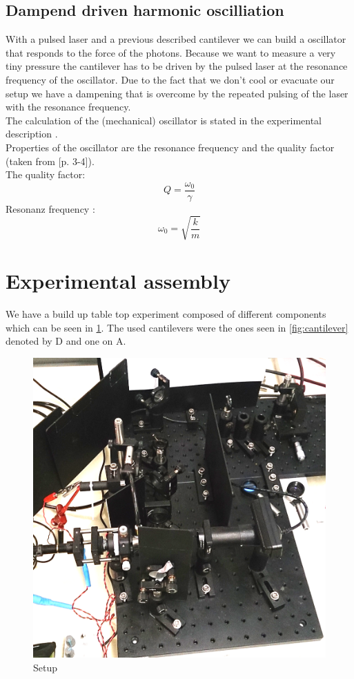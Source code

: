 \documentclass[12pt,a4paper]{article}
\begin{document}
\begin{multicols}{2}
\subsection{Dampend driven harmonic oscilliation}
With a pulsed laser and a previous described cantilever we can build a oscillator that responds to the force of the photons. Because we want to measure a very tiny pressure the cantilever has to be driven by the pulsed laser at the resonance frequency of the oscillator. Due to the fact that we don't cool or evacuate our setup we have a dampening that is overcome by the repeated pulsing of the laser with the resonance frequency.\\
The calculation of the (mechanical) oscillator is stated in the experimental description \cite{physikwiki}.\\
Properties of the oscillator are the resonance frequency and the quality factor (taken from \cite{physikwiki}[p. 3-4]).\\
The quality factor:
$$Q = \frac{\omega_0}{\gamma}$$
Resonanz frequency :
$$\omega_0 = \sqrt{\frac{k}{m}}$$

\section{Experimental assembly}
We have a build up table top experiment composed of different components which can be seen in \ref{fig:setup}. The used cantilevers were the ones seen in \ref{fig:cantilever} denoted by D and one on A.\\
\begin{figure}[H]
	\centering
	\includegraphics[scale=0.2]{../figures/aufbau.png}
	\caption{Setup}
	\label{fig:setup}
\end{figure}


\end{multicols}
\end{document}
